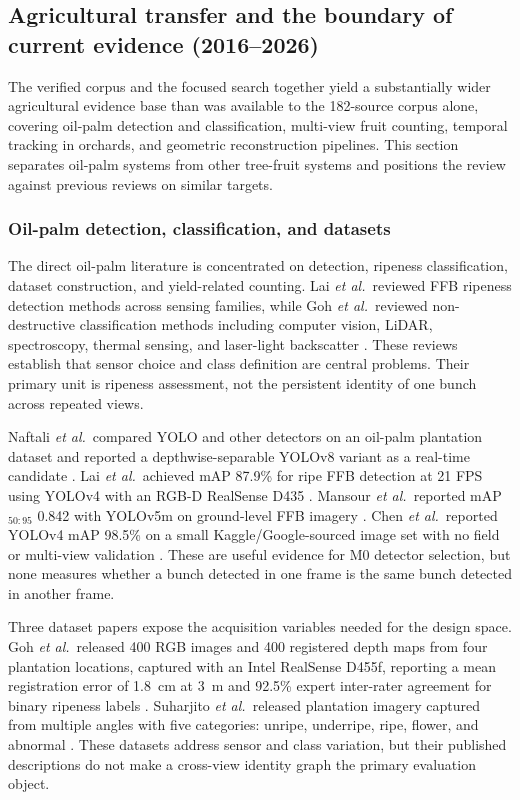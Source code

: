 \subsection{Agricultural transfer and the boundary of current evidence (2016--2026)}

The verified corpus and the focused search together yield a substantially wider agricultural evidence base than was available to the 182-source corpus alone, covering oil-palm detection and classification, multi-view fruit counting, temporal tracking in orchards, and geometric reconstruction pipelines. This section separates oil-palm systems from other tree-fruit systems and positions the review against previous reviews on similar targets.

\subsubsection{Oil-palm detection, classification, and datasets}

The direct oil-palm literature is concentrated on detection, ripeness classification, dataset construction, and yield-related counting. Lai \textit{et al.}\ reviewed FFB ripeness detection methods across sensing families, while Goh \textit{et al.}\ reviewed non-destructive classification methods including computer vision, LiDAR, spectroscopy, thermal sensing, and laser-light backscatter \cite{lai2023palmslr,goh2025palmreview}. These reviews establish that sensor choice and class definition are central problems. Their primary unit is ripeness assessment, not the persistent identity of one bunch across repeated views.

Naftali \textit{et al.}\ compared YOLO and other detectors on an oil-palm plantation dataset and reported a depthwise-separable YOLOv8 variant as a real-time candidate \cite{naftali2024palmcounter}. Lai \textit{et al.}\ achieved mAP 87.9\% for ripe FFB detection at 21 FPS using YOLOv4 with an RGB-D RealSense D435 \cite{lai2022yolov4palm}. Mansour \textit{et al.}\ reported mAP$_{50{:}95}$ 0.842 with YOLOv5m on ground-level FFB imagery \cite{ledger_r_19d96439ecdda18d}. Chen \textit{et al.}\ reported YOLOv4 mAP 98.5\% on a small Kaggle/Google-sourced image set with no field or multi-view validation \cite{chen2022ffbdet}. These are useful evidence for M0 detector selection, but none measures whether a bunch detected in one frame is the same bunch detected in another frame.

Three dataset papers expose the acquisition variables needed for the design space. Goh \textit{et al.}\ released 400 RGB images and 400 registered depth maps from four plantation locations, captured with an Intel RealSense D455f, reporting a mean registration error of 1.8~cm at 3~m and 92.5\% expert inter-rater agreement for binary ripeness labels \cite{goh2025palmdataset}. Suharjito \textit{et al.}\ released plantation imagery captured from multiple angles with five categories: unripe, underripe, ripe, flower, and abnormal \cite{suharjito2025palmdataset}. These datasets address sensor and class variation, but their published descriptions do not make a cross-view identity graph the primary evaluation object.

